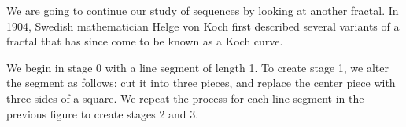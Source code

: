 We are going to continue our study of sequences by looking at another fractal. In 1904, Swedish mathematician Helge von Koch first described several variants of a fractal that has since come to be known as a Koch curve.


\begin{boxexplore}
We begin in stage 0 with a line segment of length 1. To create stage 1, we alter the segment as follows: cut it into three pieces, and replace the center piece with three sides of a square. We repeat the process for each line segment in the previous figure to create stages 2 and 3.


\end{boxexplore}
